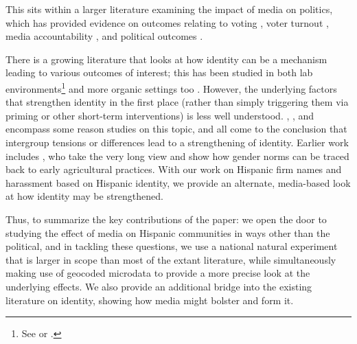 \documentclass[11pt]{article}
\begin{document}
This sits within a larger literature examining the impact of media on politics, which has provided evidence on outcomes relating to voting \citep{dellavigna_fox_2007}, voter turnout \citep{gentzkow_television_2006}, media accountability \citep{gentzkow_competition_2008}, and political outcomes \citep{stromberg_mass_2004}.

There is a growing literature that looks at how identity can be a mechanism leading to various outcomes of interest; this has been studied in both lab environments\footnote{ See \cite{benjamin_social_2007} or \cite{benjamin_religious_2010}.} and more organic settings too \citep{bursztyn_moral_2015}. However, the underlying factors that strengthen identity in the first place (rather than simply triggering them via priming or other short-term interventions) is less well understood.  \cite{bisin_bend_2010}, \cite{atkin_how_2019}, and \cite{bazzi_unity_2019} encompass some reason studies on this topic, and all come to the conclusion that intergroup tensions or differences lead to a strengthening of identity. Earlier work includes \cite{@CITE ALESINA}, who take the very long view and show how gender norms can be traced back to early agricultural practices. With our work on Hispanic firm names and harassment based on Hispanic identity, we provide an alternate, media-based look at how identity may be strengthened. 


Thus, to summarize the key contributions of the paper: we open the door to studying the effect of media on Hispanic communities in ways other than the political, and in tackling these questions, we use a national natural experiment that is larger in scope than most of the extant literature, while simultaneously making use of geocoded microdata to provide a more precise look at the underlying effects. We also provide an additional bridge into the existing literature on identity, showing how media might bolster and form it.



\end{document}
